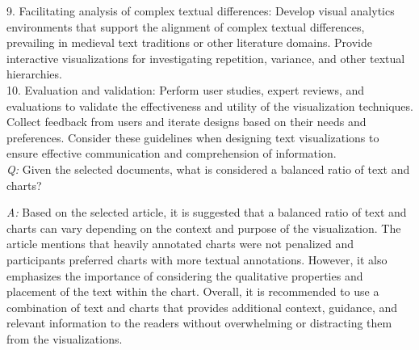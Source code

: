 9. Facilitating analysis of complex textual differences: Develop visual analytics environments that support the alignment of complex textual differences, prevailing in medieval text traditions or other literature domains. Provide interactive visualizations for investigating repetition, variance, and other textual hierarchies. \\
10. Evaluation and validation: Perform user studies, expert reviews, and evaluations to validate the effectiveness and utility of the visualization techniques. Collect feedback from users and iterate designs based on their needs and preferences. Consider these guidelines when designing text visualizations to ensure effective communication and comprehension of information.\\

\textit{Q: } Given the selected documents, what is considered a balanced ratio of text and charts?

\textit{A: }
Based on the selected article, it is suggested that a balanced ratio of text and charts can vary depending on the context and purpose of the visualization. 
The article mentions that heavily annotated charts were not penalized and participants preferred charts with more textual annotations. 
However, it also emphasizes the importance of considering the qualitative properties and placement of the text within the chart. 
Overall, it is recommended to use a combination of text and charts that provides additional context, guidance, and relevant information to the readers without overwhelming or distracting them from the visualizations.

